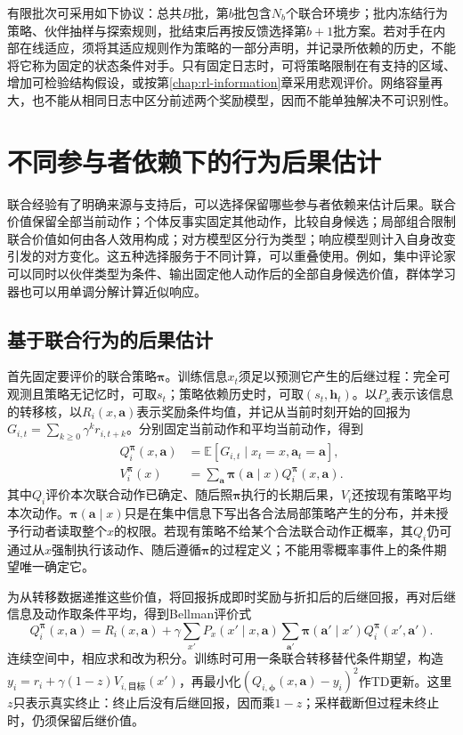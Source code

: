 有限批次可采用如下协议：总共$B$批，第$b$批包含$N_b$个联合环境步；批内冻结行为策略、伙伴抽样与探索规则，批结束后再按反馈选择第$b+1$批方案。若对手在内部在线适应，须将其适应规则作为策略的一部分声明，并记录所依赖的历史，不能将它称为固定的状态条件对手。只有固定日志时，可将策略限制在有支持的区域、增加可检验结构假设，或按第\ref{chap:rl-information}章采用悲观评价。网络容量再大，也不能从相同日志中区分前述两个奖励模型，因而不能单独解决不可识别性。

\section{不同参与者依赖下的行为后果估计}
\label{sec:rl-multi-agent-estimation}

联合经验有了明确来源与支持后，可以选择保留哪些参与者依赖来估计后果。联合价值保留全部当前动作；个体反事实固定其他动作，比较自身候选；局部组合限制联合价值如何由各人效用构成；对方模型区分行为类型；响应模型则计入自身改变引发的对方变化。这五种选择服务于不同计算，可以重叠使用。例如，集中评论家可以同时以伙伴类型为条件、输出固定他人动作后的全部自身候选价值，群体学习器也可以用单调分解计算近似响应。

\subsection{基于联合行为的后果估计}
\label{sec:rl-multi-agent-joint-value}

首先固定要评价的联合策略$\bm\pi$。训练信息$x_t$须足以预测它产生的后继过程：完全可观测且策略无记忆时，可取$s_t$；策略依赖历史时，可取$(s_t,\bm h_t)$。以$P_x$表示该信息的转移核，以$R_i(x,\bm a)$表示奖励条件均值，并记从当前时刻开始的回报为$G_{i,t}=\sum_{k\geq0}\gamma^k r_{i,t+k}$。分别固定当前动作和平均当前动作，得到
\begin{align}
 Q_i^{\bm\pi}(x,\bm a)
 &=\mathbb E[G_{i,t}\mid x_t=x,\bm a_t=\bm a],\\
 V_i^{\bm\pi}(x)
 &=\sum_{\bm a}\bm\pi(\bm a\mid x)Q_i^{\bm\pi}(x,\bm a).
\end{align}
其中$Q_i$评价本次联合动作已确定、随后照$\bm\pi$执行的长期后果，$V_i$还按现有策略平均本次动作。$\bm\pi(\bm a\mid x)$只是在集中信息下写出各合法局部策略产生的分布，并未授予行动者读取整个$x$的权限。若现有策略不给某个合法联合动作正概率，其$Q_i$仍可通过从$x$强制执行该动作、随后遵循$\bm\pi$的过程定义；不能用零概率事件上的条件期望唯一确定它。

为从转移数据递推这些价值，将回报拆成即时奖励与折扣后的后继回报，再对后继信息及动作取条件平均，得到Bellman评价式
\begin{equation}
 Q_i^{\bm\pi}(x,\bm a)=R_i(x,\bm a)+
 \gamma\sum_{x'}P_x(x'\mid x,\bm a)
       \sum_{\bm a'}\bm\pi(\bm a'\mid x')Q_i^{\bm\pi}(x',\bm a').
 \label{eq:rl-multi-agent-joint-bellman}
\end{equation}
连续空间中，相应求和改为积分。训练时可用一条联合转移替代条件期望，构造
$y_i=r_i+\gamma(1-z)V_{i,\text{目标}}(x')$，再最小化$(Q_{i,\bm\phi}(x,\bm a)-y_i)^2$作TD更新。这里$z$只表示真实终止：终止后没有后继回报，因而乘$1-z$；采样截断但过程未终止时，仍须保留后继价值。

